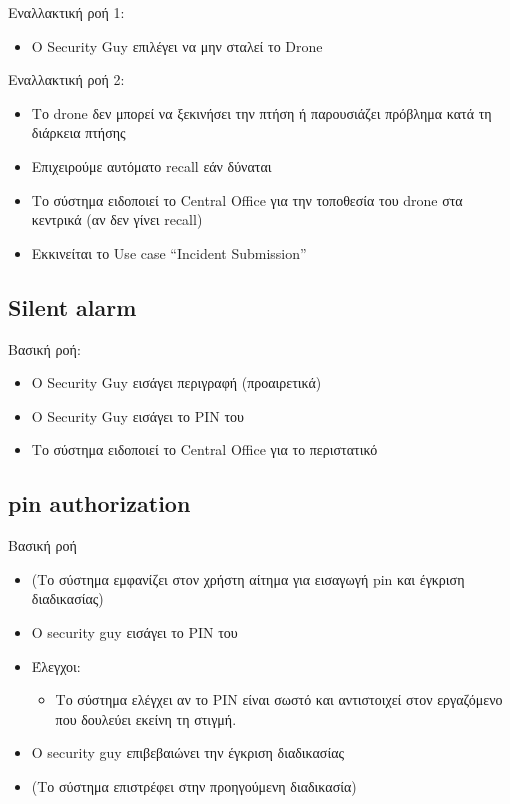 \documentclass{article}
\begin{document}
\noindent Εναλλακτική ροή 1:
\begin{itemize}
    \item Ο Security Guy επιλέγει να μην σταλεί το Drone
\end{itemize}

\noindent Εναλλακτική ροή 2:
\begin{itemize}
    \item Το drone δεν μπορεί να ξεκινήσει την πτήση ή παρουσιάζει πρόβλημα κατά τη διάρκεια πτήσης
    \item Επιχειρούμε αυτόματο recall εάν δύναται
    \item Το σύστημα ειδοποιεί το Central Office για την τοποθεσία του drone στα κεντρικά (αν δεν γίνει recall)
    \item Εκκινείται το Use case “Incident Submission”
\end{itemize}

\subsection{Silent alarm}

\noindent Βασική ροή:
\begin{itemize}
    \item O Security Guy εισάγει περιγραφή (προαιρετικά)
    \item O Security Guy εισάγει το PIN του
    \item Το σύστημα ειδοποιεί το Central Office για το περιστατικό
\end{itemize}

\subsection{pin authorization}

\noindent Βασική ροή
\begin{itemize}
    \item (Το σύστημα εμφανίζει στον χρήστη αίτημα για εισαγωγή pin και έγκριση διαδικασίας)
    \item Ο security guy εισάγει το PIN του
    \item Έλεγχοι:
    \begin{itemize}
        \item Το σύστημα ελέγχει αν το PIN είναι σωστό και αντιστοιχεί στον εργαζόμενο που δουλεύει εκείνη τη στιγμή.
    \end{itemize}
    \item Ο security guy επιβεβαιώνει την έγκριση διαδικασίας 
    \item (Το σύστημα επιστρέφει στην προηγούμενη διαδικασία)
\end{itemize}
\end{document}
